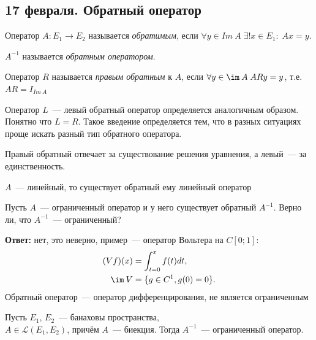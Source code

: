 \subsection{17 февраля. Обратный оператор}


\begin{definition}
    Оператор $A: E_1 \to E_2$ называется \textit{обратимым}, если $\forall y \in Im \: A \; \exists!x \in E_1: \; Ax=y.$
    
    $A^{-1}$ называется \textit{обратным оператором}.
\end{definition}

\begin{definition}
    Оператор $R$ называется \textit{правым обратным} к $A$, если $\forall y \in \im \: A \; ARy=y$, т.е. $AR=I_{Im \: A}$

    Оператор $L$~--- левый обратный оператор определяется аналогичным образом. Понятно что $L = R$. Такое введение определяется тем, что в разных ситуациях проще искать разный тип обратного оператора.
\end{definition}

\begin{lemmanote}
    Правый обратный отвечает за существование решения уравнения, а левый~--- за единственность.
\end{lemmanote}

\begin{exercise}
    $A$~--- линейный, то существует обратный ему линейный оператор
\end{exercise}

\begin{exercise}
Пусть $A$~--- ограниченный оператор и у него существует обратный $A^{-1}$. Верно ли, что $A^{-1}$~--- ограниченный?

\textbf{Ответ:} нет, это неверно, пример~--- оператор Вольтера на $C[0;1]$:
\begin{align*}
    (Vf)(x) &=\int_{t=0}^x f(t)dt,\\
    \im \: V &= \{ g \in C^1, g(0)=0 \}.
\end{align*}
Обратный оператор~--- оператор дифференцирования, не является ограниченным
\end{exercise}

\begin{theorem}\label{self-banah}\label{theorem8.4}
    Пусть $E_1$, $E_2$~--- банаховы пространства,\\$A \in \mathcal{L}(E_1, E_2)$, причём $A$~--- биекция. Тогда $A^{-1}$~--- ограниченный оператор.
\end{theorem}

